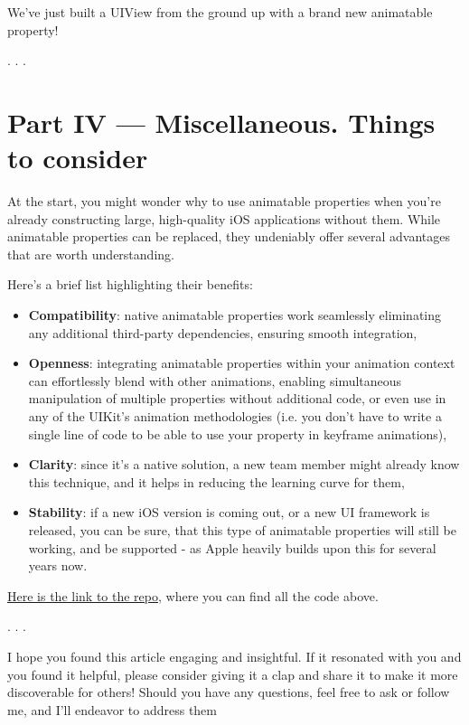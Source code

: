 \documentclass{article}
\newcommand{\separator}{\vspace{5mm}\centerline{. . .}\vspace{5mm}}
\begin{document}
We've just built a UIView from the ground up with a brand new animatable property! 

\separator

\section{Part IV — Miscellaneous. Things to consider}
\label{sec:part4}

At the start, you might wonder why to use animatable properties when you’re already constructing large, high-quality iOS applications without them. While animatable properties can be replaced, they undeniably offer several advantages that are worth understanding.

Here’s a brief list highlighting their benefits:

\begin{itemize}
  \item \textbf{Compatibility}: native animatable properties work seamlessly eliminating any additional third-party dependencies, ensuring smooth integration,
  \item \textbf{Openness}: integrating animatable properties within your animation context can effortlessly blend with other animations, enabling simultaneous manipulation of multiple properties without additional code, or even use in any of the UIKit's animation methodologies (i.e. you don't have to write a single line of code to be able to use your property in keyframe animations),
  \item \textbf{Clarity}: since it's a native solution, a new team member might already know this technique, and it helps in reducing the learning curve for them,
  \item \textbf{Stability}: if a new iOS version is coming out, or a new UI framework is released, you can be sure, that this type of animatable properties will still be working, and be supported - as Apple heavily builds upon this for several years now.
\end{itemize}

\href{https://github.com/stateman92/Medium-AnimatableProperties}{Here is the link to the repo}, where you can find all the code above.

\separator

I hope you found this article engaging and insightful. If it resonated with you and you found it helpful, please consider giving it a clap and share it to make it more discoverable for others! Should you have any questions, feel free to ask or follow me, and I’ll endeavor to address them 
\end{document}
